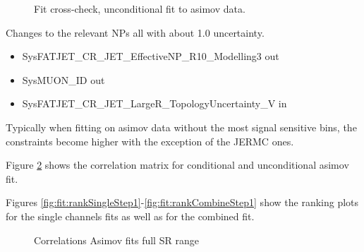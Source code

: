 \begin{figure}[ht]
      \centering
       \caption{Fit cross-check, unconditional fit to asimov data.}
       \label{fig:fit_step1_unconditional}
\end{figure}

Changes to the relevant NPs all with about 1.0 uncertainty.
\begin{itemize}
\item SysFATJET\_CR\_JET\_EffectiveNP\_R10\_Modelling3 out
\item SysMUON\_ID out
\item SysFATJET\_CR\_JET\_LargeR\_TopologyUncertainty\_V in
\end{itemize}

Typically when fitting on asimov data without the most signal sensitive bins, the constraints become higher with the exception of the JERMC ones.



\clearpage
Figure \ref{fig:fit:corrStep1} shows the correlation matrix for 
conditional and unconditional asimov fit.

Figures \ref{fig:fit:rankSingleStep1}-\ref{fig:fit:rankCombineStep1}
show the ranking plots 
for the single channels fits as well as 
for the combined fit.

\begin{figure}[b]
  \centering
  \caption{Correlations Asimov fits full SR range}
  \label{fig:fit:corrStep1}
\end{figure}



